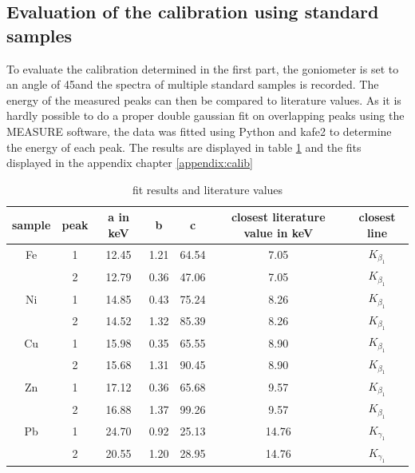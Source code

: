 \subsection{Evaluation of the calibration using standard samples}
To evaluate the calibration determined in the first part, the goniometer is set to an angle of 45\degree and the spectra of multiple standard samples is recorded. The energy of the measured peaks can then be compared to literature values. As it is hardly possible to do a proper double gaussian fit on overlapping peaks using the MEASURE software, the data was fitted using Python and kafe2 to determine the energy of each peak. The results are displayed in table \ref{table:maxcalib} and the fits displayed in the appendix chapter \ref{appendix:calib}
\begin{table}[H]
    \centering
    \label{table:maxcalib}
    \caption{fit results and literature values}
    \begin{tabular}{ccccccc}
    
        sample & peak &a in keV&b&c& closest literature value in keV &closest line\\\hline
        Fe &1 & 12.45& 1.21&64.54 & 7.05&$K_{\beta_1}$  \\
           & 2& 12.79& 0.36&47.06 & 7.05 &$K_{\beta_1}$ \\
        Ni & 1&14.85 &0.43 &75.24 & 8.26 &$K_{\beta_1}$ \\
           & 2& 14.52& 1.32 &85.39 & 8.26 & $K_{\beta_1}$ \\
        Cu & 1&15.98 & 0.35& 65.55&  8.90 & $K_{\beta_1}$\\
           & 2& 15.68&1.31 & 90.45 &  8.90 &$K_{\beta_1}$\\
        Zn & 1& 17.12&  0.36& 65.68 &  9.57 &$K_{\beta_1}$ \\
           & 2&16.88 & 1.37& 99.26&  9.57 & $K_{\beta_1}$\\
        Pb & 1&24.70 &0.92 &25.13 &  14.76 &$K_{\gamma_1}$ \\
           & 2&20.55&1.20 &28.95 &  14.76 &$K_{\gamma_1}$ \\\hline
        \end{tabular}
    
\end{table}
